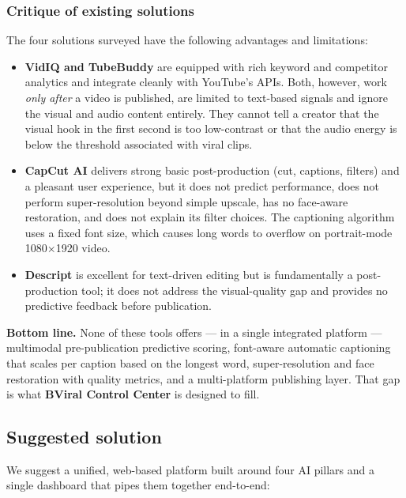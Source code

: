 \subsubsection{Critique of existing solutions}
\label{sec:existing_critique}

The four solutions surveyed have the following advantages and limitations:

\begin{itemize}
  \item \textbf{VidIQ and TubeBuddy} are equipped with rich keyword and competitor analytics
        and integrate cleanly with YouTube's APIs. Both, however, work \emph{only after} a
        video is published, are limited to text-based signals and ignore the visual and
        audio content entirely. They cannot tell a creator that the visual hook in the first
        second is too low-contrast or that the audio energy is below the threshold associated
        with viral clips.
  \item \textbf{CapCut AI} delivers strong basic post-production (cut, captions, filters) and
        a pleasant user experience, but it does not predict performance, does not perform
        super-resolution beyond simple upscale, has no face-aware restoration, and does not
        explain its filter choices. The captioning algorithm uses a fixed font size, which
        causes long words to overflow on portrait-mode 1080$\times$1920 video.
  \item \textbf{Descript} is excellent for text-driven editing but is fundamentally a
        post-production tool; it does not address the visual-quality gap and provides no
        predictive feedback before publication.
\end{itemize}

\noindent\textbf{Bottom line.} None of these tools offers --- in a single integrated platform
--- multimodal pre-publication predictive scoring, font-aware automatic captioning that scales
per caption based on the longest word, super-resolution and face restoration with quality
metrics, and a multi-platform publishing layer. That gap is what \textbf{BViral Control
Center} is designed to fill.

\subsection{Suggested solution}
\label{sec:suggested}

We suggest a unified, web-based platform built around four AI pillars and a single dashboard
that pipes them together end-to-end:


